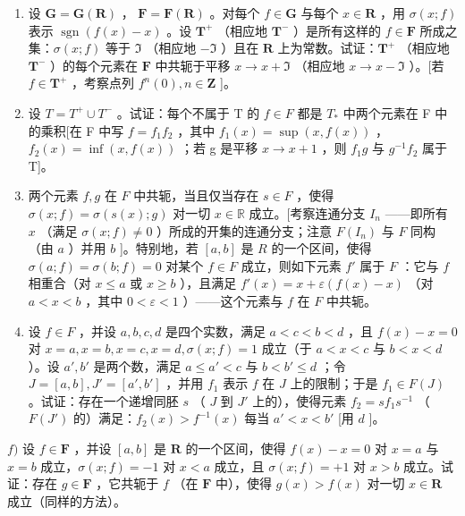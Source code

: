 \begin{enumerate}
\def\labelenumi{\alph{enumi})}
\setcounter{enumi}{1}
\item
设 \(\mathbf{G} = \mathbf{G}(\mathbf{R})\) ， \(\mathbf{F} = \mathbf{F}(\mathbf{R})\) 。对每个 \(f \in \mathbf{G}\) 与每个 \(x \in \mathbf{R}\) ，用 \(\sigma(x; f)\) 表示 \(\operatorname{sgn}(f(x) - x)\) 。设 \(\mathbf{T}^{+}\) （相应地 \(\mathbf{T}^{-}\) ）是所有这样的 \(f \in \mathbf{F}\) 所成之集：\(\sigma(x; f)\) 等于 \(\mathfrak{I}\) （相应地 \(-\mathfrak{I}\) ）且在 \(\mathbf{R}\) 上为常数。试证：\(\mathbf{T}^{+}\) （相应地 \(\mathbf{T}^{-}\) ）的每个元素在 \(\mathbf{F}\) 中共轭于平移 \(x \to x + \mathfrak{I}\) （相应地 \(x \to x - \mathfrak{I}\) ）。{[}若 \(f \in \mathbf{T}^{+}\) ，考察点列 \(f^{n}(0), n \in \mathbf{Z}\) {]}。
\item
设 \(T = T^{+} \cup T^{-}\) 。试证：每个不属于 T 的 \(f \in F\) 都是 \(T_{*}\) 中两个元素在 F 中的乘积{[}在 F 中写 \(f = f_{1}f_{2}\) ，其中 \(f_{1}(x) = \sup (x, f(x))\) ， \(f_{2}(x) = \inf (x, f(x))\) ；若 g 是平移 \(x \to x + 1\) ，则 \(f_{1}g\) 与 \(g^{-1}f_{2}\) 属于 T{]}。
\item
两个元素 \(f, g\) 在 \(F\) 中共轭，当且仅当存在 \(s \in F\) ，使得 \(\sigma(x; f) = \sigma(s(x); g)\) 对一切 \(x \in \mathbb{R}\) 成立。{[}考察连通分支 \(I_n\) ——即所有 \(x\) （满足 \(\sigma(x; f) \neq 0\) ）所成的开集的连通分支；注意 \(F(I_n)\) 与 \(F\) 同构（由 \(a\) ）并用 \(b\) {]}。特别地，若 \([a, b]\) 是 \(R\) 的一个区间，使得 \(\sigma(a; f) = \sigma(b; f) = 0\) 对某个 \(f \in F\) 成立，则如下元素 \(f'\) 属于 \(F\) ：它与 \(f\) 相重合（对 \(x \leqslant a\) 或 \(x \geqslant b\) ），且满足 \(f'(x) = x + \varepsilon(f(x) - x)\) （对 \(a < x < b\) ，其中 \(0 < \varepsilon < 1\) ）——这个元素与 \(f\) 在 \(F\) 中共轭。
\item
设 \(f \in F\) ，并设 \(a, b, c, d\) 是四个实数，满足 \(a < c < b < d\) ，且 \(f(x) - x = 0\) 对 \(x = a, x = b, x = c, x = d, \sigma(x; f) = 1\) 成立（于 \(a < x < c\) 与 \(b < x < d\) ）。设 \(a', b'\) 是两个数，满足 \(a \leqslant a' < c\) 与 \(b < b' \leqslant d\) ；令 \(J = [a, b], J' = [a', b']\) ，并用 \(f_1\) 表示 \(f\) 在 \(J\) 上的限制；于是 \(f_1 \in F(J)\) 。试证：存在一个递增同胚 \(s\) （ \(J\) 到 \(J'\) 上的），使得元素 \(f_2 = sf_1s^{-1}\) （ \(F(J')\) 的）满足：\(f_2(x) > f^{-1}(x)\) 每当 \(a' < x < b'\) {[}用 \(d\) {]}。
\end{enumerate}

\(f)\) 设 \(f \in \mathbf{F}\) ，并设 \([a, b]\) 是 \(\mathbf{R}\) 的一个区间，使得 \(f(x) - x = 0\) 对 \(x = a\) 与 \(x = b\) 成立，\(\sigma(x; f) = -1\) 对 \(x < a\) 成立，且 \(\sigma(x; f) = +1\) 对 \(x > b\) 成立。试证：存在 \(g \in \mathbf{F}\) ，它共轭于 \(f\) （在 \(\mathbf{F}\) 中），使得 \(g(x) > f(x)\) 对一切 \(x \in \mathbf{R}\) 成立（同样的方法）。

